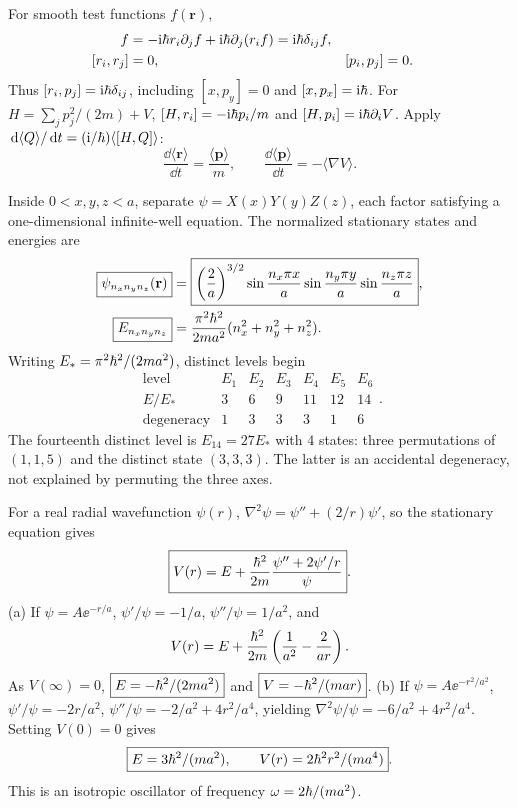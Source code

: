 For smooth test functions $f(\mathbf r)$,
\begin{align}
[r_i,p_j]f&=-\ii\sh r_i\partial_j f+
\ii\sh\partial_j(r_if)=\ii\sh\delta_{ij}f,\\
[r_i,r_j]&=0,&[p_i,p_j]&=0.
\end{align}
Thus $[r_i,p_j]=\mathrm i\hbar\delta_{ij}$, including
$[x,p_y]=0$ and $[x,p_x]=\mathrm i\hbar$.
For $H=\sum_jp_j^2/(2m)+V$,
$[H,r_i]=-\mathrm i\hbar p_i/m$ and
$[H,p_i]=\mathrm i\hbar\partial_iV$. Apply
$\,\mathrm d\langle Q\rangle/\,\mathrm d t=(\mathrm i/\hbar)
\langle[H,Q]\rangle$:
\begin{equation}
\boxed{\frac{\dd\langle\mathbf r\rangle}{\dd t}
=\frac{\langle\mathbf p\rangle}{m},
\qquad
\frac{\dd\langle\mathbf p\rangle}{\dd t}
=-\langle\nabla V\rangle}.
\end{equation}

Inside $0<x,y,z<a$, separate
$\psi=X(x)Y(y)Z(z)$, each factor satisfying
a one-dimensional infinite-well equation.
The normalized stationary states and energies are
\begin{align}
\boxed{\psi_{n_xn_yn_z}(\mathbf r)}
&=\boxed{\left(\frac2a\right)^{3/2}
\sin\frac{n_x\pi x}{a}
\sin\frac{n_y\pi y}{a}
\sin\frac{n_z\pi z}{a}},\\
\boxed{E_{n_xn_yn_z}}&=
\frac{\pi^2\hbar^2}{2ma^2}(n_x^2+n_y^2+n_z^2).
\end{align}
Writing $E_*=\pi^2\hbar^2/(2ma^2)$, distinct
levels begin
\begin{equation}
\begin{array}{c|rrrrrr}
\text{level}&E_1&E_2&E_3&E_4&E_5&E_6\\\hline
E/E_*&3&6&9&11&12&14\\
\text{degeneracy}&1&3&3&3&1&6
\end{array}.
\end{equation}
The fourteenth distinct level is
$\boxed{E_{14}=27E_*}$ with
$\boxed{4}$ states: three permutations of $(1,1,5)$
and the distinct state $(3,3,3)$.
The latter is an accidental degeneracy,
not explained by permuting the three axes.

For a real radial wavefunction $\psi(r)$,
$\nabla^2\psi=\psi''+(2/r)\psi'$, so the
stationary equation gives
\begin{equation}
\boxed{V(r)=E+\frac{\hbar^2}{2m}
\frac{\psi''+2\psi'/r}{\psi}}.
\end{equation}
(a) If $\psi=A\ee^{-r/a}$,
$\psi'/\psi=-1/a$,
$\psi''/\psi=1/a^2$, and
\begin{equation}
V(r)=E+\frac{\hbar^2}{2m}
\left(\frac1{a^2}-\frac2{ar}\right).
\end{equation}
As $V(\infty)=0$,
$\boxed{E=-\hbar^2/(2ma^2)}$ and
$\boxed{V=-\hbar^2/(mar)}$.
(b) If $\psi=A\ee^{-r^2/a^2}$,
$\psi'/\psi=-2r/a^2$,
$\psi''/\psi=-2/a^2+4r^2/a^4$, yielding
$\nabla^2\psi/\psi=-6/a^2+4r^2/a^4$.
Setting $V(0)=0$ gives
\begin{equation}
\boxed{E=3\hbar^2/(ma^2),\qquad
V(r)=2\hbar^2r^2/(ma^4)}.
\end{equation}
This is an isotropic oscillator of frequency
$\omega=2\hbar/(ma^2)$.

